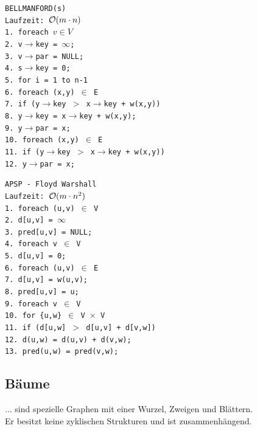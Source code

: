 \documentclass[fs, footer]{latex4ei}
\renewcommand{\t}{\texttt}
\begin{document}
\begin{multicols*}{4}
{{	\parbox{3.6cm}{
	\t{BELLMANFORD(s) \\
	Laufzeit: $\operatorname{\mathcal O}(m\cdot n)$\\
	1.	foreach $v \in V$\\
	2.	\quad	v$\rightarrow$key = $\infty$;\\
	3.	\quad	v$\rightarrow$par = NULL;\\
	4.	s$\rightarrow$key = 0;\\
	5.	for i = 1 to n-1\\
	6.	\quad	foreach (x,y) $\in$ E\\
	7.	\quad \quad		if (y$\rightarrow$key $>$ x$\rightarrow$key + w(x,y))\\
	8.	\quad \quad \quad			y$\rightarrow$key = x$\rightarrow$key + w(x,y);\\
	9.	\quad \quad \quad			y$\rightarrow$par = x;\\
	10.	foreach (x,y) $\in$ E\\
	11.	\quad	if (y$\rightarrow$key $>$ x$\rightarrow$key + w(x,y))\\
	12.	\quad \quad		y$\rightarrow$par = x;\\
	}}
	\parbox{3.5cm}{
	\t{APSP - Floyd Warshall \\
	Laufzeit: $\operatorname{\mathcal O}(m\cdot n^2)$\\
	1.	foreach (u,v) $\in$ V\\
	2. \quad	d[u,v] = $\infty$\\
	3. \quad	pred[u,v] = NULL;\\
	4.	foreach v $\in$ V\\
	5. \quad	d[u,v] = 0;\\
	6.	foreach (u,v) $\in$ E\\
	7. \quad	d[u,v] = w(u,v);\\
	8. \quad	pred[u,v] = u;\\
	9.	foreach v $\in$ V\\
	10. \quad	for \{u,w\} $\in$ V $\times$ V\\
	11. \quad \quad	if (d[u,w] $>$ d[u,v] + d[v,w])\\
	12.	\quad \quad \quad	d(u,w) = d(u,v) + d(v,w);\\
	13. \quad \quad \quad	pred(u,w) = pred(v,w);
	}}

\subsection{Bäume}
... sind spezielle Graphen mit einer Wurzel, Zweigen und Blättern.\\
Er besitzt keine zyklischen Strukturen und ist zusammenhängend.\\

}}
\end{multicols*}
\end{document}
